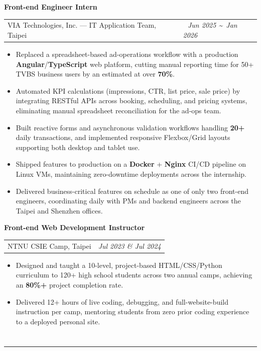 \documentclass{article}
\makeatletter
\newcommand{\TitleShadow}[1]{
  \hspace{-0.4cm}
  \shadowtext{\fontsize{16pt}{22pt}\selectfont {\StrLeft{#1}{1}}}%
  \shadowtext{\fontsize{12pt}{18pt}\selectfont \hspace{-0.5em}\StrGobbleLeft{#1}{1}}%
}
\newenvironment{workexperience}[4]{
    \noindent
    \large \textbf{#1} \\ [0.1cm]
    \normalsize 
    \begin{tabular}{@{}l@{\hspace{0.5cm}}l@{}}
      #2, #3 & \textcolor{customblue}{\textit{\textsf{#4}}}  
    \end{tabular} 
    \vspace{-0.15cm}
    \fontsize{9.5pt}{12pt}\selectfont
    \begin{itemize}[leftmargin=0.6cm, labelsep=0.3cm, itemsep=-0.05cm]
}{
    \end{itemize}
}
\makeatother
\begin{document}
\begin{workexperience}{Front-end Engineer Intern}{VIA Technologies, Inc. — IT Application Team}{Taipei}{\textbar\ \,Jun 2025 \textasciitilde\ Jan 2026}
    \item Replaced a spreadsheet-based ad-operations workflow with a production \textbf{Angular}/\textbf{TypeScript} web platform, cutting manual reporting time for 50+ TVBS business users by an estimated at over \textbf{70\%}.

    \item Automated KPI calculations (impressions, CTR, list price, sale price) by integrating RESTful APIs across booking, scheduling, and pricing systems, eliminating manual spreadsheet reconciliation for the ad-ops team.

    \item Built reactive forms and asynchronous validation workflows handling \textbf{20+} daily transactions, and implemented responsive Flexbox/Grid layouts supporting both desktop and tablet use.

    \item Shipped features to production on a \textbf{Docker} + \textbf{Nginx} CI/CD pipeline on Linux VMs, maintaining zero-downtime deployments across the internship.

    \item Delivered business-critical features on schedule as one of only two front-end engineers, coordinating daily with PMs and backend engineers across the Taipei and Shenzhen offices.
\end{workexperience}

\vspace{-0.1cm}

\begin{workexperience}{Front-end Web Development Instructor}{NTNU CSIE Camp}{Taipei}{Jul 2023 \& Jul 2024}
    \item Designed and taught a 10-level, project-based HTML/CSS/Python curriculum to 120+ high school students across two annual camps, achieving an \textbf{80\%+} project completion rate.
    \item Delivered 12+ hours of live coding, debugging, and full-website-build instruction per camp, mentoring students from zero prior coding experience to a deployed personal site.
\end{workexperience}

\vspace{-0.5cm}

\section*{\TitleShadow{EDUCATION}}
\vspace{-0.5cm}
\noindent\rule{\textwidth}{0.4pt} 
\vspace{-0.25cm}
\end{document}
